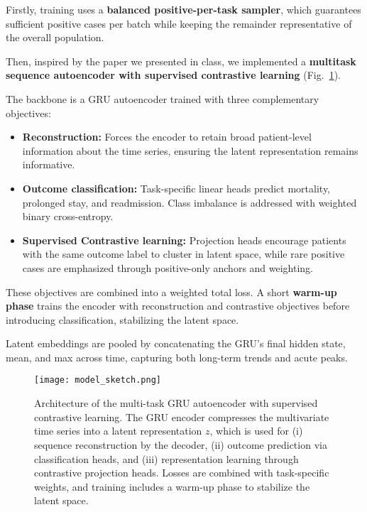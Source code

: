 \documentclass{article}
\theoremstyle{plain}
\theoremstyle{definition}
\theoremstyle{remark}
\begin{document}
Firstly, training uses a \textbf{balanced positive-per-task sampler}, which guarantees sufficient positive cases per batch while keeping the remainder representative of the overall population.

Then, inspired by the paper we presented in class, we implemented a \textbf{multitask sequence autoencoder with supervised contrastive learning} (Fig.~\ref{fig:model}). 

The backbone is a GRU autoencoder trained with three complementary objectives: 

\begin{itemize}
    \item \textbf{Reconstruction:} Forces the encoder to retain broad patient-level information about the time series, ensuring the latent representation remains informative.  
    \item \textbf{Outcome classification:} Task-specific linear heads predict mortality, prolonged stay, and readmission. Class imbalance is addressed with weighted binary cross-entropy.  
    \item \textbf{Supervised Contrastive learning:} Projection heads encourage patients with the same outcome label to cluster in latent space, while rare positive cases are emphasized through positive-only anchors and weighting.  
\end{itemize}

These objectives are combined into a weighted total loss. A short \textbf{warm-up phase} trains the encoder with reconstruction and contrastive objectives before introducing classification, stabilizing the latent space. 

Latent embeddings are pooled by concatenating the GRU’s final hidden state, mean, and max across time, capturing both long-term trends and acute peaks.  

\begin{figure}[h]
    \centering
    \texttt{[image: model\_sketch.png]}
    \caption{Architecture of the multi-task GRU autoencoder with supervised contrastive learning. 
    The GRU encoder compresses the multivariate time series into a latent representation $z$, which is 
    used for (i) sequence reconstruction by the decoder, (ii) outcome prediction via classification heads, 
    and (iii) representation learning through contrastive projection heads. Losses are combined with 
    task-specific weights, and training includes a warm-up phase to stabilize the latent space.}
    \label{fig:model}
\end{figure}
\end{document}
